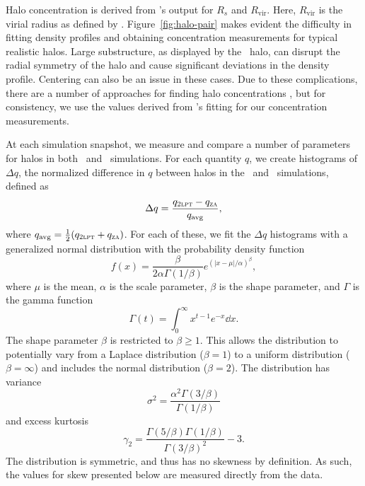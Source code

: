 Halo concentration is derived from \rockstar's output for $R_{s}$ and $R_{\mathrm{vir}}$.  Here, $R_{\mathrm{vir}}$ is the virial radius as defined by \citet{1998ApJ...495...80B}.  Figure~\ref{fig:halo-pair} makes evident the difficulty in fitting density profiles and obtaining concentration measurements for typical realistic halos.  Large substructure, as displayed by the \za\ halo, can disrupt the radial symmetry of the halo and cause significant deviations in the density profile.  Centering can also be an issue in these cases.  Due to these complications, there are a number of approaches for finding halo concentrations \citep{2012MNRAS.423.3018P}, but for consistency, we use the values derived from \rockstar's fitting for our concentration measurements.






At each simulation snapshot, we measure and compare a number of parameters for halos in both \lpt\ and \za\ simulations.  For each quantity $q$, we create histograms of $\Delta q$, the normalized difference in $q$ between halos in the \lpt\ and \za\ simulations, defined as
\begin{equation} \label{eq:delta_q}
	\Delta q = \frac{q_{\textsc{2lpt}} - q_{\textsc{za}}}{q_{\mathrm{avg}}},
\end{equation}
where $q_{\mathrm{avg}} = \frac{1}{2} (q_{\textsc{2lpt}} + q_{\textsc{za}})$.  For each of these, we fit the $\Delta q$ histograms with a generalized normal distribution \citep{doi:10.1080/02664760500079464} with the probability density function
\begin{equation} \label{eq:generalized_normal}
	f(x) = \frac{ \beta }{2 \alpha \Gamma(1 / \beta)} e^{\left( \left| x - \mu \right| / \alpha \right)^{\beta}},
\end{equation}
where $\mu$ is the mean, $\alpha$ is the scale parameter, $\beta$ is the shape parameter, and $\Gamma$ is the gamma function
\begin{equation} \label{eq:gamma_function}
	\Gamma(t) = \int_{0}^{\infty} x^{t-1} e^{-x} \dd x.
\end{equation}
The shape parameter $\beta$ is restricted to $\beta \geq 1$.  This allows the distribution to potentially vary from a Laplace distribution ($\beta = 1$) to a uniform distribution ($\beta = \infty$) and includes the normal distribution ($\beta = 2$).  The distribution has variance
\begin{equation} \label{eq:variance}
	\sigma^{2} = \frac{ \alpha^{2} \Gamma(3/\beta) }{ \Gamma(1/\beta) }
\end{equation}
and excess kurtosis
\begin{equation} \label{eq:kurtosis}
	\gamma_{2} = \frac{ \Gamma(5/\beta) \Gamma(1/\beta) }{ \Gamma(3/\beta)^{2} } - 3.
\end{equation}
The distribution is symmetric, and thus has no skewness by definition.  As such, the values for skew presented below are measured directly from the data.

